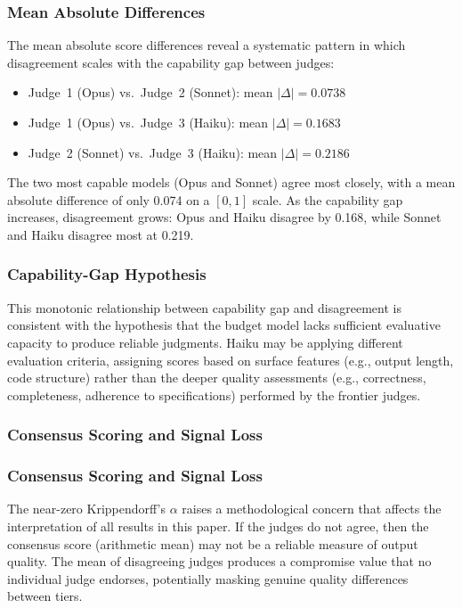 \documentclass[11pt]{article}
\begin{document}
\subsubsection{Mean Absolute Differences}

The mean absolute score differences reveal a systematic pattern in which
disagreement scales with the capability gap between judges:

\begin{itemize}
  \item Judge~1 (Opus) vs.\ Judge~2 (Sonnet): mean $|\Delta| = 0.0738$
  \item Judge~1 (Opus) vs.\ Judge~3 (Haiku): mean $|\Delta| = 0.1683$
  \item Judge~2 (Sonnet) vs.\ Judge~3 (Haiku): mean $|\Delta| = 0.2186$
\end{itemize}

The two most capable models (Opus and Sonnet) agree most closely, with a mean
absolute difference of only 0.074 on a $[0, 1]$ scale. As the capability gap
increases, disagreement grows: Opus and Haiku disagree by 0.168, while Sonnet
and Haiku disagree most at 0.219.

\subsubsection{Capability-Gap Hypothesis}

This monotonic relationship between capability gap and disagreement is
consistent with the hypothesis that the budget model lacks sufficient
evaluative capacity to produce reliable judgments. Haiku may be applying
different evaluation criteria, assigning scores based on surface features
(e.g., output length, code structure) rather than the deeper quality
assessments (e.g., correctness, completeness, adherence to specifications)
performed by the frontier judges.

\subsubsection{Consensus Scoring and Signal Loss}

\subsubsection{Consensus Scoring and Signal Loss}

The near-zero Krippendorff's $\alpha$ raises a methodological concern that
affects the interpretation of all results in this paper. If the judges do not
agree, then the consensus score (arithmetic mean) may not be a reliable
measure of output quality. The mean of disagreeing judges produces a
compromise value that no individual judge endorses, potentially masking
genuine quality differences between tiers.
\end{document}
